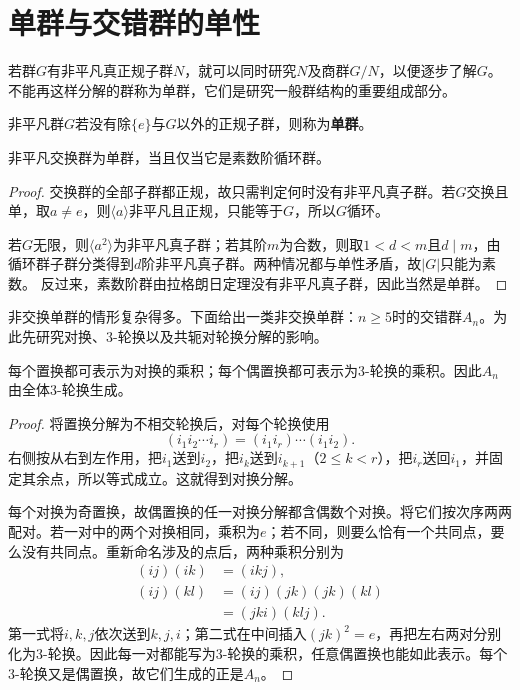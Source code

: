 \section{单群与交错群的单性}

若群$G$有非平凡真正规子群$N$，就可以同时研究$N$及商群$G/N$，以便逐步了解$G$。不能再这样分解的群称为单群，它们是研究一般群结构的重要组成部分。

\begin{definition}
非平凡群$G$若没有除$\{e\}$与$G$以外的正规子群，则称为\textbf{单群}。
\end{definition}

\begin{proposition}
非平凡交换群为单群，当且仅当它是素数阶循环群。
\end{proposition}
\begin{proof}
交换群的全部子群都正规，故只需判定何时没有非平凡真子群。若$G$交换且单，取$a\ne e$，则$\langle a\rangle$非平凡且正规，只能等于$G$，所以$G$循环。

若$G$无限，则$\langle a^2\rangle$为非平凡真子群；若其阶$m$为合数，则取$1<d<m$且$d\mid m$，由循环群子群分类得到$d$阶非平凡真子群。两种情况都与单性矛盾，故$|G|$只能为素数。
反过来，素数阶群由拉格朗日定理没有非平凡真子群，因此当然是单群。
\end{proof}

非交换单群的情形复杂得多。下面给出一类非交换单群：$n\geq5$时的交错群$A_n$。为此先研究对换、3-轮换以及共轭对轮换分解的影响。

\begin{lemma}\label{p2:three-cycles}
每个置换都可表示为对换的乘积；每个偶置换都可表示为3-轮换的乘积。因此$A_n$由全体3-轮换生成。
\end{lemma}
\begin{proof}
将置换分解为不相交轮换后，对每个轮换使用
\[
(i_1i_2\cdots i_r)=(i_1i_r)\cdots(i_1i_2).
\]
右侧按从右到左作用，把$i_1$送到$i_2$，把$i_k$送到$i_{k+1}$（$2\leq k<r$），把$i_r$送回$i_1$，并固定其余点，所以等式成立。这就得到对换分解。

每个对换为奇置换，故偶置换的任一对换分解都含偶数个对换。将它们按次序两两配对。若一对中的两个对换相同，乘积为$e$；若不同，则要么恰有一个共同点，要么没有共同点。重新命名涉及的点后，两种乘积分别为
\begin{align*}
(ij)(ik)&=(ikj),\\
(ij)(kl)&=(ij)(jk)(jk)(kl)\\
&=(jki)(klj).
\end{align*}
第一式将$i,k,j$依次送到$k,j,i$；第二式在中间插入$(jk)^2=e$，再把左右两对分别化为3-轮换。因此每一对都能写为3-轮换的乘积，任意偶置换也能如此表示。每个3-轮换又是偶置换，故它们生成的正是$A_n$。
\end{proof}

